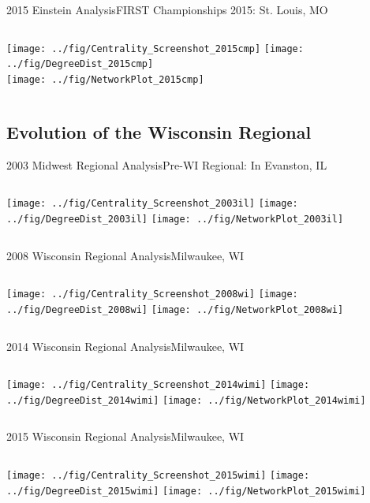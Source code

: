 \documentclass[10pt]{beamer}
\begin{document}
\begin{frame}{2015 Einstein Analysis}{FIRST Championships 2015: St. Louis, MO}
	\begin{columns}
		\texttt{[image: ../fig/Centrality\_Screenshot\_2015cmp]}
		\texttt{[image: ../fig/DegreeDist\_2015cmp]}\\
		\texttt{[image: ../fig/NetworkPlot\_2015cmp]}
	\end{columns}
\end{frame}
\subsection{Evolution of the Wisconsin Regional}
\begin{frame}{2003 Midwest Regional Analysis}{Pre-WI Regional: In Evanston, IL}
	\begin{columns}
		\column{0.35 \textwidth}
		\texttt{[image: ../fig/Centrality\_Screenshot\_2003il]}
		\column{0.3 \textwidth}
		\texttt{[image: ../fig/DegreeDist\_2003il]}
		\column{0.3 \textwidth}
		\texttt{[image: ../fig/NetworkPlot\_2003il]}
	\end{columns}
\end{frame}
\begin{frame}{2008 Wisconsin Regional Analysis}{Milwaukee, WI}
	\begin{columns}
		\texttt{[image: ../fig/Centrality\_Screenshot\_2008wi]}
		\texttt{[image: ../fig/DegreeDist\_2008wi]}
		\texttt{[image: ../fig/NetworkPlot\_2008wi]}
	\end{columns}
\end{frame}
\begin{frame}{2014 Wisconsin Regional Analysis}{Milwaukee, WI}
	\begin{columns}
		\column{0.35 \textwidth}
		\texttt{[image: ../fig/Centrality\_Screenshot\_2014wimi]}
		\column{0.3 \textwidth}
		\texttt{[image: ../fig/DegreeDist\_2014wimi]}
		\column{0.3 \textwidth}
		\texttt{[image: ../fig/NetworkPlot\_2014wimi]}
	\end{columns}
\end{frame}
\begin{frame}{2015 Wisconsin Regional Analysis}{Milwaukee, WI}
	\begin{columns}
		\texttt{[image: ../fig/Centrality\_Screenshot\_2015wimi]}
		\texttt{[image: ../fig/DegreeDist\_2015wimi]}
		\texttt{[image: ../fig/NetworkPlot\_2015wimi]}
	\end{columns}
\end{frame}
\end{document}
